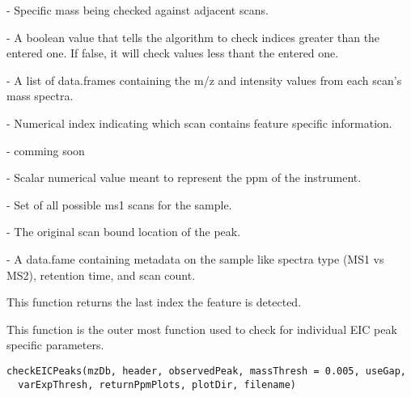 \documentclass[a4paper]{book}
\begin{document}
%
\begin{Arguments}
\begin{ldescription}
\item[\code{mass}] - Specific mass being checked against adjacent scans.

\item[\code{upper}] - A boolean value that tells the algorithm to check indices
greater than the entered one.  If false, it will check values less thant the
entered one.

\item[\code{mzDb}] - A list of data.frames containing the m/z and intensity values
from each scan's mass spectra.

\item[\code{currentIndex}] - Numerical index indicating which scan contains
feature specific information.

\item[\code{intensityStorage}] - comming soon

\item[\code{ppmEst}] - Scalar numerical value meant to represent the ppm of the
instrument.

\item[\code{scans}] - Set of all possible ms1 scans for the sample.

\item[\code{origBound}] - The original scan bound location of the peak.

\item[\code{header}] - A data.fame containing metadata on the sample like
spectra type (MS1 vs MS2), retention time, and scan count.
\end{ldescription}
\end{Arguments}
%
\begin{Value}
This function returns the last index the feature is detected.
\end{Value}
%
\begin{Description}\relax
This function is the outer most function used to check for
individual EIC peak specific parameters.
\end{Description}
%
\begin{Usage}
\begin{verbatim}
checkEICPeaks(mzDb, header, observedPeak, massThresh = 0.005, useGap,
  varExpThresh, returnPpmPlots, plotDir, filename)
\end{verbatim}
\end{Usage}
\end{document}
